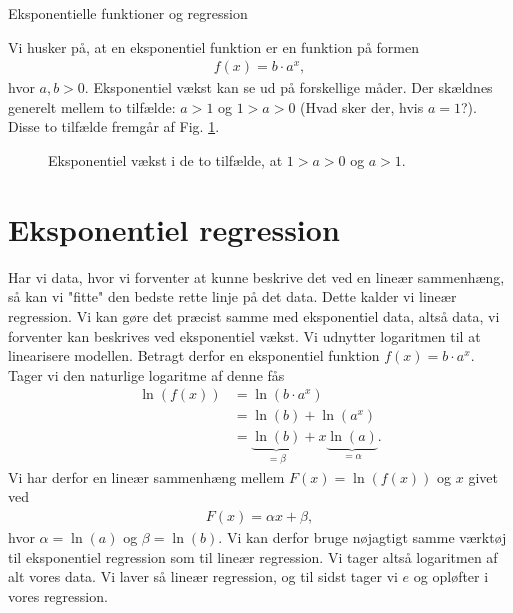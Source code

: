 \begin{center}
\Huge
Eksponentielle funktioner og regression
\end{center}
Vi husker på, at en eksponentiel funktion er en funktion på formen
\begin{align*}
f(x) = b\cdot a^x,
\end{align*}
hvor $a,b>0.$ Eksponentiel vækst kan se ud på forskellige måder. Der skældnes generelt mellem to tilfælde: $a>1$ og $1>a>0$ (Hvad sker der, hvis $a=1$?). Disse to tilfælde fremgår af Fig. \ref{fig:eksp}.
\begin{figure}[H]
\centering
{}
\caption{Eksponentiel vækst i de to tilfælde, at $1>a>0$ og $a>1$.}
\label{fig:eksp}
\end{figure}

\section*{Eksponentiel regression}
Har vi data, hvor vi forventer at kunne beskrive det ved en lineær sammenhæng, så kan vi "fitte" den bedste rette linje på det data. Dette kalder vi lineær regression. Vi kan gøre det præcist samme med eksponentiel data, altså data, vi forventer kan beskrives ved eksponentiel vækst. Vi udnytter logaritmen til at linearisere modellen. Betragt derfor en eksponentiel funktion $f(x) = b\cdot a^x$. Tager vi den naturlige logaritme af denne fås
\begin{align*}
\ln(f(x)) &= \ln\left(b\cdot a^x\right) \\
 &= \ln(b)+\ln(a^x)\\
 &= \underbrace{\ln(b)}_{=\beta}+x\underbrace{\ln(a)}_{=\alpha}.
\end{align*}
Vi har derfor en lineær sammenhæng mellem $F(x) = \ln(f(x))$ og $x$ givet ved
\begin{align*}
F(x) = \alpha x + \beta,
\end{align*}
hvor $\alpha = \ln(a)$ og $\beta = \ln(b)$. Vi kan derfor bruge nøjagtigt samme værktøj til eksponentiel regression som til lineær regression. Vi tager altså logaritmen af alt vores data. Vi laver så lineær regression, og til sidst tager vi $e$ og opløfter i vores regression. 

